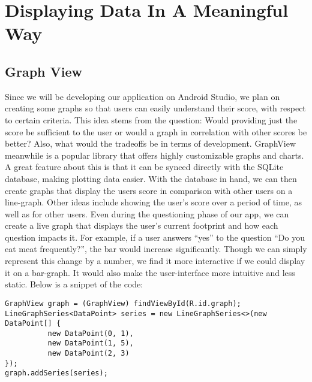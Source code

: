 \documentclass[onecolumn, draftclsnofoot,10pt, compsoc, tikz]{IEEEtran}
\begin{document}
\clearpage
\section{Displaying Data In A Meaningful Way}
\subsection{Graph View}
Since we will be developing our application on Android Studio, we plan on creating some graphs so that users can easily understand their score, with respect to certain criteria. This idea stems from the question: Would providing just the score be sufficient to the user or would a graph in correlation with other scores be better? Also, what would the tradeoffs be in terms of development. GraphView meanwhile is a popular library that offers highly customizable graphs and charts\cite{2}. A great feature about this is that it can be synced directly with the SQLite database, making plotting data easier. With the database in hand, we can then create graphs that display the users score in comparison with other users on a line-graph. Other ideas include showing the user’s score over a period of time, as well as for other users. Even during the questioning phase of our app, we can create a live graph that displays the user’s current footprint and how each question impacts it. For example, if a user answers “yes” to the question “Do you eat meat frequently?”, the bar would increase significantly. Though we can simply represent this change by a number, we find it more interactive if we could display it on a bar-graph. It would also make the user-interface more intuitive and less static. Below is a snippet of the code:
\begin{lstlisting}
GraphView graph = (GraphView) findViewById(R.id.graph);
LineGraphSeries<DataPoint> series = new LineGraphSeries<>(new DataPoint[] {
          new DataPoint(0, 1),
          new DataPoint(1, 5),
          new DataPoint(2, 3)
});
graph.addSeries(series);
\end{lstlisting}
\end{document}
